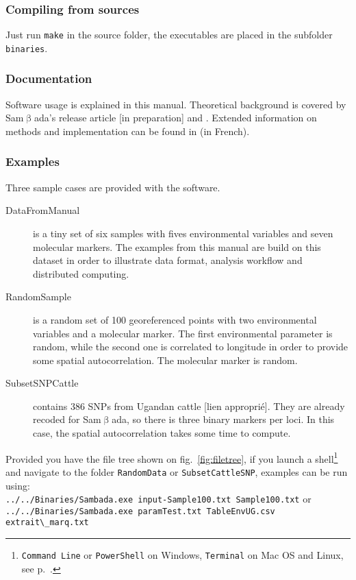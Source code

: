 \documentclass[a4paper,11pt]{article}
\newcommand{\smb}{\textsf{Sam$\upbeta$ada}}
\newcommand{\prog}[1]{\texttt{#1}}
\begin{document}
\subsubsection*{Compiling from sources}
Just run \prog{make} in the source folder, the executables are placed in the subfolder \prog{binaries}.

\subsubsection*{Documentation}
Software usage is explained in this manual.
Theoretical background is covered by \smb's release article [in preparation] and \textcite{joost:2007}.
Extended information on methods and implementation can be found in \textcite{stucki:2014} (in French).

\subsubsection*{Examples}
Three sample cases are provided with the software.
\begin{description}
\item[DataFromManual] is a tiny set of six samples with fives environmental variables and seven molecular markers.
The examples from this manual are build on this dataset in order to illustrate data format, analysis workflow and distributed computing. 
\item[RandomSample] is a random set of 100 georeferenced points with two environmental variables and a molecular marker.
The first environmental parameter is random, while the second one is correlated to longitude in order to provide some spatial autocorrelation.
The molecular marker is random.
\item[SubsetSNPCattle] contains 386 SNPs from Ugandan cattle [lien approprié].
They are already recoded for \smb, so there is three binary markers per loci.
In this case, the spatial autocorrelation takes some time to compute.
\end{description}

Provided you have the file tree shown on fig.~\ref{fig:filetree},
if you launch a shell\footnote{\prog{Command Line} or \prog{PowerShell} on Windows, \prog{Terminal} on Mac OS and Linux, see p.~\pageref{faq:commandline}.} and navigate to the folder \prog{RandomData} or \prog{SubsetCattleSNP}, examples can be run using: \\
\verb+../../Binaries/Sambada.exe input-Sample100.txt Sample100.txt+ or\\
\verb+../../Binaries/Sambada.exe paramTest.txt TableEnvUG.csv extrait\_marq.txt+
\label{sec:examples-launch}
\end{document}
